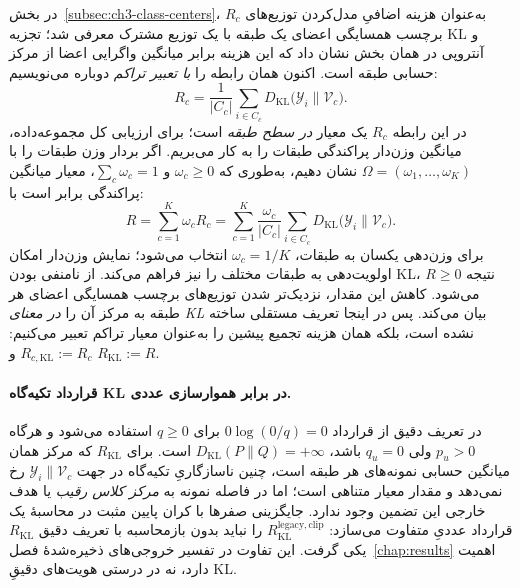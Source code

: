 در بخش~\ref{subsec:ch3-class-centers}،
$R_c$ به‌عنوان هزینه اضافیِ مدل‌کردن
توزیع‌های برچسب همسایگی اعضای یک طبقه
با یک توزیع مشترک معرفی شد؛
تجزیه KL و آنتروپی در همان بخش نشان داد
که این هزینه برابر میانگین واگرایی
اعضا از مرکز حسابی طبقه است.
اکنون همان رابطه را \emph{با تعبیر تراکم}
دوباره می‌نویسیم:
\begin{equation}\label{eq:ch3-R-class}
R_c=\frac{1}{|C_c|}\sum_{i\in C_c}
D_{\mathrm{KL}}\bigl(\mathscr Y_i\|\mathcal V_c\bigr).
\end{equation}
در این رابطه $R_c$ یک معیار \emph{در سطح طبقه} است؛ برای ارزیابی کل مجموعه‌داده، میانگین وزن‌دار پراکندگی طبقات را به کار می‌بریم. اگر بردار وزن طبقات را با $\Omega=(\omega_1,\ldots,\omega_K)$ نشان دهیم، به‌طوری که $\omega_c\ge0$ و $\sum_c\omega_c=1$، معیار میانگین پراکندگی برابر است با:
\begin{equation}\label{eq:ch3-R-average}
\boxed{R=\sum_{c=1}^{K}\omega_c R_c
=\sum_{c=1}^{K}\frac{\omega_c}{|C_c|}
\sum_{i\in C_c}D_{\mathrm{KL}}\bigl(\mathscr Y_i\|\mathcal V_c\bigr).}
\end{equation}
برای وزن‌دهی یکسان به طبقات،
$\omega_c=1/K$ انتخاب می‌شود؛
نمایش وزن‌دار امکان اولویت‌دهی
به طبقات مختلف را نیز فراهم می‌کند.
از نامنفی بودن KL، $R\ge0$ نتیجه می‌شود.
کاهش این مقدار، نزدیک‌تر شدن توزیع‌های
برچسب همسایگی اعضای هر طبقه به
مرکز آن را \emph{در معنای KL} بیان می‌کند.
پس در اینجا تعریف مستقلی ساخته نشده است،
بلکه همان هزینه تجمیع پیشین را
به‌عنوان معیار تراکم تعبیر می‌کنیم:
$R_{c,\mathrm{KL}}:=R_c$ و
$R_{\mathrm{KL}}:=R$.


\paragraph{قرارداد تکیه‌گاه KL در برابر هموارسازی عددی.}
\label{par:ch3-KL-legacy-clip}
در تعریف دقیق از قرارداد $0\log(0/q)=0$ برای $q\ge0$
استفاده می‌شود و هرگاه $p_u>0$ ولی $q_u=0$ باشد،
$D_{\mathrm{KL}}(P\|Q)=+\infty$ است.
برای $R_{\mathrm{KL}}$ که مرکز همان میانگین حسابی
نمونه‌های هر طبقه است، چنین ناسازگاریِ تکیه‌گاه
در جهت $\mathscr Y_i\|\mathcal V_c$ رخ نمی‌دهد
و مقدار معیار متناهی است؛ اما در فاصله نمونه به
\emph{مرکز کلاس رقیب} یا هدف خارجی این تضمین وجود ندارد.
جایگزینی صفرها با کران پایین مثبت در محاسبهٔ
 یک قرارداد عددیِ متفاوت می‌سازد:
$R_{\mathrm{KL}}^{\mathrm{legacy,clip}}$
را نباید بدون باز‌محاسبه با تعریف دقیق
$R_{\mathrm{KL}}$ یکی گرفت. این تفاوت در
تفسیر خروجی‌های ذخیره‌شدهٔ فصل~\ref{chap:results}
اهمیت دارد، نه در درستی هویت‌های دقیقِ KL.

